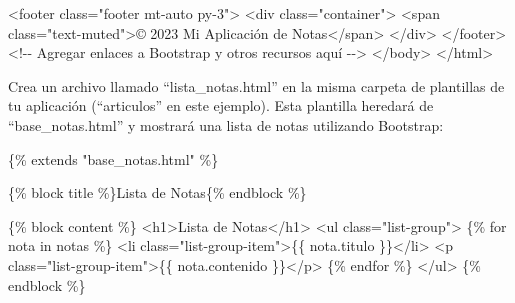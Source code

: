 \documentclass[
  a4paper,
  DIV=11,
  numbers=noendperiod,
  onepage,
  openany]{scrreprt}
\newenvironment{Shaded}{\begin{snugshade}}{\end{snugshade}}
\newcommand{\CommentTok}[1]{\textcolor[rgb]{0.37,0.37,0.37}{#1}}
\newcommand{\DataTypeTok}[1]{\textcolor[rgb]{0.68,0.00,0.00}{#1}}
\newcommand{\KeywordTok}[1]{\textcolor[rgb]{0.00,0.23,0.31}{#1}}
\newcommand{\NormalTok}[1]{\textcolor[rgb]{0.00,0.23,0.31}{#1}}
\newcommand{\OperatorTok}[1]{\textcolor[rgb]{0.37,0.37,0.37}{#1}}
\newcommand{\OtherTok}[1]{\textcolor[rgb]{0.00,0.23,0.31}{#1}}
\newcommand{\StringTok}[1]{\textcolor[rgb]{0.13,0.47,0.30}{#1}}
\begin{document}
\begin{Shaded}
\begin{Highlighting}[]
    \DataTypeTok{\textless{}}\KeywordTok{footer}\OtherTok{ class}\OperatorTok{=}\StringTok{"footer mt{-}auto py{-}3"}\DataTypeTok{\textgreater{}}
        \DataTypeTok{\textless{}}\KeywordTok{div}\OtherTok{ class}\OperatorTok{=}\StringTok{"container"}\DataTypeTok{\textgreater{}}
            \DataTypeTok{\textless{}}\KeywordTok{span}\OtherTok{ class}\OperatorTok{=}\StringTok{"text{-}muted"}\DataTypeTok{\textgreater{}}\NormalTok{© 2023 Mi Aplicación de Notas}\DataTypeTok{\textless{}/}\KeywordTok{span}\DataTypeTok{\textgreater{}}
        \DataTypeTok{\textless{}/}\KeywordTok{div}\DataTypeTok{\textgreater{}}
    \DataTypeTok{\textless{}/}\KeywordTok{footer}\DataTypeTok{\textgreater{}}
    \CommentTok{\textless{}!{-}{-} Agregar enlaces a Bootstrap y otros recursos aquí {-}{-}\textgreater{}}
\DataTypeTok{\textless{}/}\KeywordTok{body}\DataTypeTok{\textgreater{}}
\DataTypeTok{\textless{}/}\KeywordTok{html}\DataTypeTok{\textgreater{}}
\end{Highlighting}
\end{Shaded}

Crea un archivo llamado ``lista\_notas.html'' en la misma carpeta de
plantillas de tu aplicación (``articulos'' en este ejemplo). Esta
plantilla heredará de ``base\_notas.html'' y mostrará una lista de notas
utilizando Bootstrap:

\begin{Shaded}
\begin{Highlighting}[]
\NormalTok{\{\% extends "base\_notas.html" \%\}}

\NormalTok{\{\% block title \%\}Lista de Notas\{\% endblock \%\}}

\NormalTok{\{\% block content \%\}}
    \DataTypeTok{\textless{}}\KeywordTok{h1}\DataTypeTok{\textgreater{}}\NormalTok{Lista de Notas}\DataTypeTok{\textless{}/}\KeywordTok{h1}\DataTypeTok{\textgreater{}}
    \DataTypeTok{\textless{}}\KeywordTok{ul}\OtherTok{ class}\OperatorTok{=}\StringTok{"list{-}group"}\DataTypeTok{\textgreater{}}
\NormalTok{        \{\% for nota in notas \%\}}
            \DataTypeTok{\textless{}}\KeywordTok{li}\OtherTok{ class}\OperatorTok{=}\StringTok{"list{-}group{-}item"}\DataTypeTok{\textgreater{}}\NormalTok{\{\{ nota.titulo \}\}}\DataTypeTok{\textless{}/}\KeywordTok{li}\DataTypeTok{\textgreater{}}
            \DataTypeTok{\textless{}}\KeywordTok{p}\OtherTok{ class}\OperatorTok{=}\StringTok{"list{-}group{-}item"}\DataTypeTok{\textgreater{}}\NormalTok{\{\{ nota.contenido \}\}}\DataTypeTok{\textless{}/}\KeywordTok{p}\DataTypeTok{\textgreater{}}
\NormalTok{        \{\% endfor \%\}}
    \DataTypeTok{\textless{}/}\KeywordTok{ul}\DataTypeTok{\textgreater{}}
\NormalTok{\{\% endblock \%\}}
\end{Highlighting}
\end{Shaded}
\end{document}
